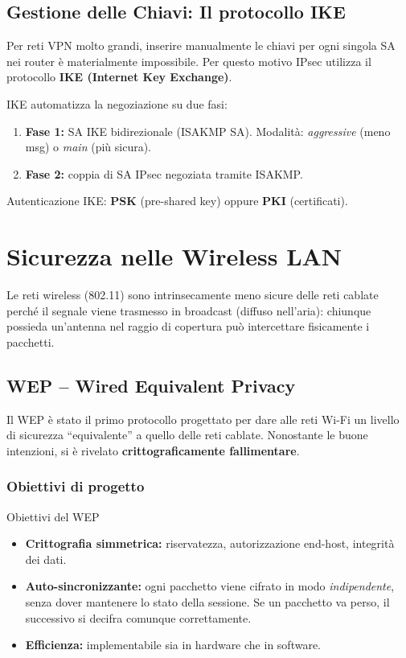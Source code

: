 \documentclass[a4paper,12pt]{report}
\begin{document}
\subsection{Gestione delle Chiavi: Il protocollo IKE}
Per reti VPN molto grandi, inserire manualmente le chiavi per ogni singola SA nei router è materialmente impossibile. Per questo motivo IPsec utilizza il protocollo \textbf{IKE (Internet Key Exchange)}.


IKE automatizza la negoziazione su due fasi:
\begin{enumerate}[noitemsep]
  \item \textbf{Fase 1:} SA IKE bidirezionale (ISAKMP SA).
        Modalit\`a: \emph{aggressive} (meno msg) o \emph{main} (pi\`u sicura).
  \item \textbf{Fase 2:} coppia di SA IPsec negoziata tramite ISAKMP.
\end{enumerate}
Autenticazione IKE: \textbf{PSK} (pre-shared key) oppure \textbf{PKI} (certificati).

\newpage


\section{Sicurezza nelle Wireless LAN}

Le reti wireless (802.11) sono intrinsecamente meno sicure delle reti cablate perché il segnale viene trasmesso in broadcast (diffuso nell'aria): chiunque possieda un'antenna nel raggio di copertura può intercettare fisicamente i pacchetti.


\subsection{WEP -- Wired Equivalent Privacy}

Il WEP \`e stato il primo protocollo progettato per dare alle reti Wi-Fi un livello
di sicurezza ``equivalente'' a quello delle reti cablate. Nonostante le buone
intenzioni, si \`e rivelato \textbf{crittograficamente fallimentare}.

\subsubsection{Obiettivi di progetto}

\begin{defbox}{Obiettivi del WEP}
\begin{itemize}[noitemsep]
  \item \textbf{Crittografia simmetrica:} riservatezza, autorizzazione end-host, integrit\`a dei dati.
  \item \textbf{Auto-sincronizzante:} ogni pacchetto viene cifrato in modo \emph{indipendente},
        senza dover mantenere lo stato della sessione.
        Se un pacchetto va perso, il successivo si decifra comunque correttamente.
  \item \textbf{Efficienza:} implementabile sia in hardware che in software.
\end{itemize}
\end{defbox}
\end{document}
